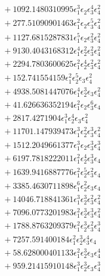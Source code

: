 \documentclass[10pt]{article}
\begin{document}
\begin{align*}
&{}  + 1092.1480310995 \epsilon_{1}^{3} \epsilon_{2} \epsilon_{3}^{4} \epsilon_{4}^{2} \\
&{}  + 277.51090901463 \epsilon_{1}^{2} \epsilon_{2} \epsilon_{3}^{5} \epsilon_{4}^{2} \\
&{}  + 1127.6815287831 \epsilon_{1}^{5} \epsilon_{2} \epsilon_{3}^{2} \epsilon_{4}^{2} \\
&{}  + 9130.4043168312 \epsilon_{1}^{4} \epsilon_{2}^{2} \epsilon_{3}^{2} \epsilon_{4}^{2} \\
&{}  + 2294.7803600625 \epsilon_{1}^{2} \epsilon_{2}^{4} \epsilon_{3}^{2} \epsilon_{4}^{2} \\
&{}  + 152.741554159 \epsilon_{1}^{2} \epsilon_{2}^{5} \epsilon_{3} \epsilon_{4}^{2} \\
&{}  + 4938.5081447076 \epsilon_{1}^{4} \epsilon_{2}^{3} \epsilon_{3} \epsilon_{4}^{2} \\
&{}  + 41.626636352194 \epsilon_{1}^{2} \epsilon_{2} \epsilon_{3}^{6} \epsilon_{4} \\
&{}  + 2817.4271904 \epsilon_{1}^{3} \epsilon_{2}^{4} \epsilon_{3} \epsilon_{4}^{2} \\
&{}  + 11701.147939473 \epsilon_{1}^{3} \epsilon_{2}^{2} \epsilon_{3}^{3} \epsilon_{4}^{2} \\
&{}  + 1512.2049661377 \epsilon_{1}^{3} \epsilon_{2} \epsilon_{3}^{3} \epsilon_{4}^{3} \\
&{}  + 6197.7818222011 \epsilon_{1}^{2} \epsilon_{2}^{4} \epsilon_{3}^{3} \epsilon_{4} \\
&{}  + 1639.9416887776 \epsilon_{1}^{2} \epsilon_{2}^{5} \epsilon_{3}^{2} \epsilon_{4} \\
&{}  + 3385.4630711898 \epsilon_{1}^{6} \epsilon_{2}^{2} \epsilon_{3} \epsilon_{4} \\
&{}  + 14046.718841361 \epsilon_{1}^{3} \epsilon_{2}^{3} \epsilon_{3}^{2} \epsilon_{4}^{2} \\
&{}  + 7096.0773201983 \epsilon_{1}^{2} \epsilon_{2}^{3} \epsilon_{3}^{3} \epsilon_{4}^{2} \\
&{}  + 1788.8763209379 \epsilon_{1}^{2} \epsilon_{2}^{3} \epsilon_{3}^{2} \epsilon_{4}^{3} \\
&{}  + 7257.591400184 \epsilon_{1}^{2} \epsilon_{2}^{3} \epsilon_{3}^{4} \epsilon_{4} \\
&{}  + 58.628000401133 \epsilon_{1}^{2} \epsilon_{2}^{3} \epsilon_{3} \epsilon_{4}^{4} \\
&{}  + 959.21415910148 \epsilon_{1}^{3} \epsilon_{2}^{3} \epsilon_{3} \epsilon_{4}^{3} \\

\end{align*}
\end{document}
